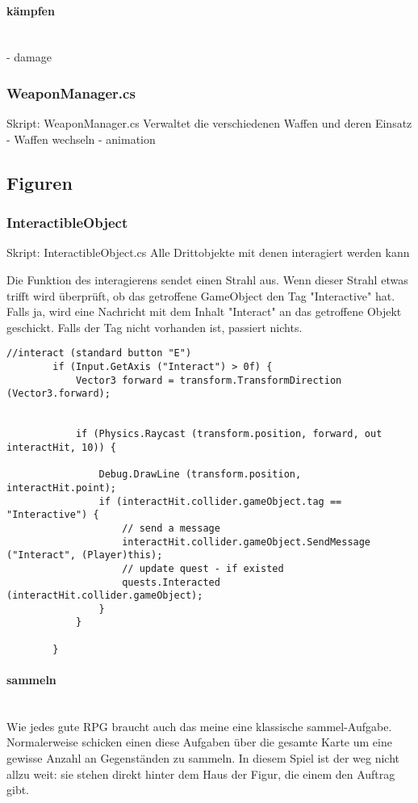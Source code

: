 \paragraph{kämpfen}\mbox{} \\
- damage

\subsubsection{WeaponManager.cs}
Skript: WeaponManager.cs
Verwaltet die verschiedenen Waffen und deren Einsatz
- Waffen wechseln
- animation

\subsection{Figuren}

\subsubsection{InteractibleObject}
Skript: InteractibleObject.cs
Alle Drittobjekte mit denen interagiert werden kann

Die Funktion des interagierens sendet einen Strahl aus.
Wenn dieser Strahl etwas trifft wird überprüft, ob das getroffene GameObject den Tag "Interactive" hat. Falls ja, wird eine Nachricht mit dem Inhalt "Interact" an das getroffene Objekt geschickt. Falls der Tag nicht vorhanden ist, passiert nichts.

\begin{lstlisting}
//interact (standard button "E")
		if (Input.GetAxis ("Interact") > 0f) {
			Vector3 forward = transform.TransformDirection (Vector3.forward);


			if (Physics.Raycast (transform.position, forward, out interactHit, 10)) {	
				
				Debug.DrawLine (transform.position, interactHit.point);
				if (interactHit.collider.gameObject.tag == "Interactive") {
					// send a message
					interactHit.collider.gameObject.SendMessage ("Interact", (Player)this);
					// update quest - if existed
					quests.Interacted (interactHit.collider.gameObject);
				}
			}
				
		}
\end{lstlisting}

\paragraph{sammeln}\mbox{} \\
Wie jedes gute RPG braucht auch das meine eine klassische sammel-Aufgabe.
Normalerweise schicken einen diese Aufgaben über die gesamte Karte um eine gewisse Anzahl an Gegenständen zu sammeln.
In diesem Spiel ist der weg nicht allzu weit: sie stehen direkt hinter dem Haus der Figur, die einem den Auftrag gibt.

